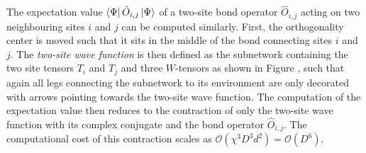 The expectation value $\bra{\Psi}\hat{O}_{i,j}\ket{\Psi}$ of a two-site bond operator $\hat{O}_{i,j}$ acting on two neighbouring sites $i$ and $j$ can be computed similarly. First, the orthogonality center is moved such that it sits in the middle of the bond connecting sites $i$ and $j$. The \textit{two-site wave function} is then defined as the subnetwork containing the two site tensors $T_i$ and $T_j$ and three $W$-tensors as shown in Figure , such that again all legs connecting the subnetwork to its environment are only decorated with arrows pointing towards the two-site wave function. The computation of the expectation value then reduces to the contraction of only the two-site wave function with its complex conjugate and the bond operator $\hat{O}_{i,j}$. The computational cost of this contraction scales as $\mathcal{O}\left(\chi^3D^3d^2\right) = \mathcal{O}(D^6)$.